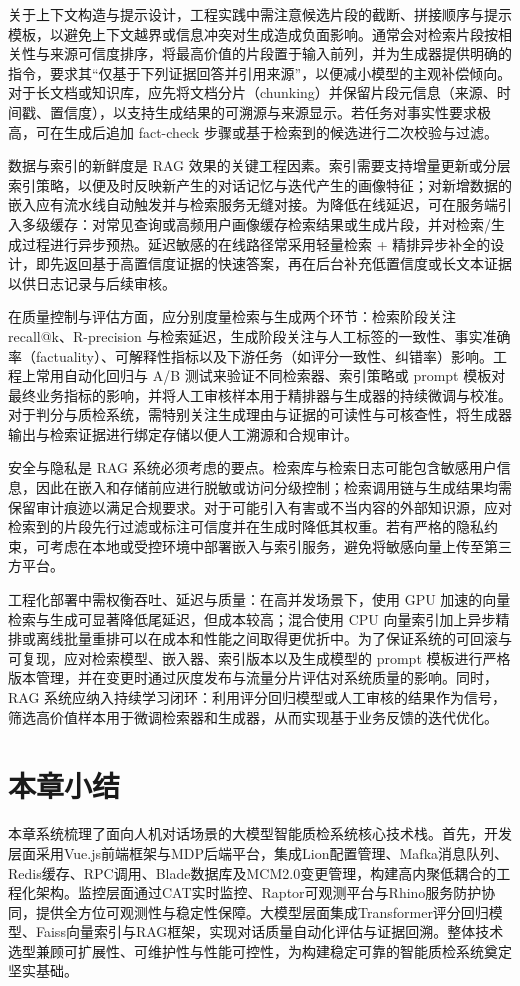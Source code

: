 关于上下文构造与提示设计，工程实践中需注意候选片段的截断、拼接顺序与提示模板，以避免上下文越界或信息冲突对生成造成负面影响。通常会对检索片段按相关性与来源可信度排序，将最高价值的片段置于输入前列，并为生成器提供明确的指令，要求其“仅基于下列证据回答并引用来源”，以便减小模型的主观补偿倾向。对于长文档或知识库，应先将文档分片（chunking）并保留片段元信息（来源、时间戳、置信度），以支持生成结果的可溯源与来源显示。若任务对事实性要求极高，可在生成后追加 fact-check 步骤或基于检索到的候选进行二次校验与过滤。

数据与索引的新鲜度是 RAG 效果的关键工程因素。索引需要支持增量更新或分层索引策略，以便及时反映新产生的对话记忆与迭代产生的画像特征；对新增数据的嵌入应有流水线自动触发并与检索服务无缝对接。为降低在线延迟，可在服务端引入多级缓存：对常见查询或高频用户画像缓存检索结果或生成片段，并对检索/生成过程进行异步预热。延迟敏感的在线路径常采用轻量检索 + 精排异步补全的设计，即先返回基于高置信度证据的快速答案，再在后台补充低置信度或长文本证据以供日志记录与后续审核。

在质量控制与评估方面，应分别度量检索与生成两个环节：检索阶段关注 recall@k、R-precision 与检索延迟，生成阶段关注与人工标签的一致性、事实准确率（factuality）、可解释性指标以及下游任务（如评分一致性、纠错率）影响。工程上常用自动化回归与 A/B 测试来验证不同检索器、索引策略或 prompt 模板对最终业务指标的影响\cite{saad-falcon-etal-2024-ares}，并将人工审核样本用于精排器与生成器的持续微调与校准。对于判分与质检系统，需特别关注生成理由与证据的可读性与可核查性，将生成器输出与检索证据进行绑定存储以便人工溯源和合规审计。

安全与隐私是 RAG 系统必须考虑的要点。检索库与检索日志可能包含敏感用户信息，因此在嵌入和存储前应进行脱敏或访问分级控制；检索调用链与生成结果均需保留审计痕迹以满足合规要求。对于可能引入有害或不当内容的外部知识源，应对检索到的片段先行过滤或标注可信度并在生成时降低其权重。若有严格的隐私约束，可考虑在本地或受控环境中部署嵌入与索引服务，避免将敏感向量上传至第三方平台\cite{doi:10.36227/techrxiv.175036754.46793269/v1}。

工程化部署中需权衡吞吐、延迟与质量：在高并发场景下，使用 GPU 加速的向量检索与生成可显著降低尾延迟，但成本较高；混合使用 CPU 向量索引加上异步精排或离线批量重排可以在成本和性能之间取得更优折中。为了保证系统的可回滚与可复现，应对检索模型、嵌入器、索引版本以及生成模型的 prompt 模板进行严格版本管理，并在变更时通过灰度发布与流量分片评估对系统质量的影响。同时，RAG 系统应纳入持续学习闭环：利用评分回归模型或人工审核的结果作为信号，筛选高价值样本用于微调检索器和生成器，从而实现基于业务反馈的迭代优化。

\section{本章小结}
本章系统梳理了面向人机对话场景的大模型智能质检系统核心技术栈。首先，开发层面采用Vue.js前端框架与MDP后端平台，集成Lion配置管理、Mafka消息队列、Redis缓存、RPC调用、Blade数据库及MCM2.0变更管理，构建高内聚低耦合的工程化架构。监控层面通过CAT实时监控、Raptor可观测平台与Rhino服务防护协同，提供全方位可观测性与稳定性保障。大模型层面集成Transformer评分回归模型、Faiss向量索引与RAG框架，实现对话质量自动化评估与证据回溯。整体技术选型兼顾可扩展性、可维护性与性能可控性，为构建稳定可靠的智能质检系统奠定坚实基础。
